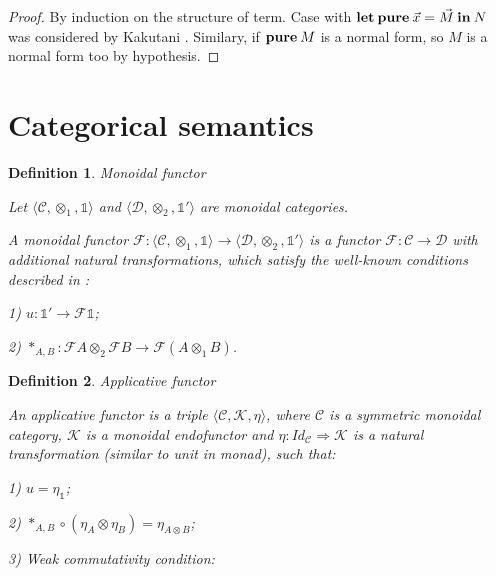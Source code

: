 \documentclass[a4paper]{article}
\newtheorem{defin}{Definition}
\begin{document}
\begin{proof}
  By induction on the structure of term. Case with ${\bf let \: pure\:} \vec{x} = \vec{M} {\: \bf in \:} N$ was considered by Kakutani \cite{ModalK} \cite{ModalK1}.
  Similary, if ${\bf pure \:} M$ is a normal form, so $M$ is a normal form too by hypothesis.
\end{proof}

\section{Categorical semantics}

\begin{defin} Monoidal functor

  Let $\langle \mathcal{C}, \otimes_1, \mathds{1} \rangle$ and $\langle \mathcal{D}, \otimes_2, \mathds{1}' \rangle$ are monoidal categories.

  A monoidal functor $\mathcal{F} : \langle \mathcal{C}, \otimes_1, \mathds{1} \rangle \to \langle \mathcal{D}, \otimes_2, \mathds{1}' \rangle$ is a functor
  $\mathcal{F} : \mathcal{C} \to \mathcal{D}$ with additional natural transformations, which satisfy the well-known conditions described in \cite{ElKelly}:

  1) $u : \mathds{1}' \to \mathcal{F}\mathds{1}$;

  2) $\ast_{A, B} : \mathcal{F}A \otimes_2 \mathcal{F}B \to \mathcal{F}(A \otimes_1 B)$.

\end{defin}

\begin{defin} Applicative functor

  An applicative functor is a triple $\langle \mathcal{C}, \mathcal{K}, \eta \rangle$,
where $\mathcal{C}$ is a symmetric monoidal category, $\mathcal{K}$ is a monoidal endofunctor and $\eta : Id_{\mathcal{C}} \Rightarrow \mathcal{K}$ is a natural transformation (similar to unit in monad), such that:

1) $u = \eta_{\mathds{1}}$;

2) $\ast_{A,B} \circ (\eta_A \otimes \eta_B) = \eta_{A \otimes B}$;

3) Weak commutativity condition:

\end{defin}
\end{document}
